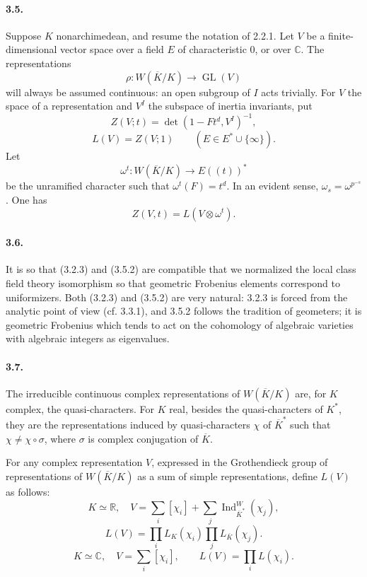 \documentclass[10pt]{article}
\newcommand{\C}{\mathbb C}
\newcommand{\GL}{\operatorname{GL}}
\newcommand{\Ind}{\operatorname{Ind}}
\providecommand{\R}{\mathbb R}
\begin{document}
\paragraph{3.5.} Suppose \(K\) nonarchimedean, and resume the notation of 2.2.1. Let \(V\) be a finite-dimensional vector space over a field \(E\) of characteristic \(0\), or over \(\C\). The representations
\[
\rho:W(\overline K/K)\longrightarrow\GL(V)
\]
will always be assumed continuous: an open subgroup of \(I\) acts trivially. For \(V\) the space of a representation and \(V^I\) the subspace of inertia invariants, put
\[
\tag{3.5.1}
Z(V;t)=\det(1-Ft^d,V^I)^{-1},
\]
\[
\tag{3.5.2}
L(V)=Z(V;1)\qquad(E\in E^*\cup\{\infty\}).
\]
Let
\[
\omega^t:W(\overline K/K)\longrightarrow E((t))^*
\]
be the unramified character such that \(\omega^t(F)=t^d\). In an evident sense, \(\omega_s=\omega^{p^{-s}}\). One has
\[
\tag{3.5.3}
Z(V,t)=L(V\otimes\omega^t).
\]

\paragraph{3.6.} It is so that (3.2.3) and (3.5.2) are compatible that we normalized the local class field theory isomorphism so that geometric Frobenius elements correspond to uniformizers. Both (3.2.3) and (3.5.2) are very natural: 3.2.3 is forced from the analytic point of view (cf. 3.3.1), and 3.5.2 follows the tradition of geometers; it is geometric Frobenius which tends to act on the cohomology of algebraic varieties with algebraic integers as eigenvalues.

\paragraph{3.7.} The irreducible continuous complex representations of \(W(\overline K/K)\) are, for \(K\) complex, the quasi-characters. For \(K\) real, besides the quasi-characters of \(K^*\), they are the representations induced by quasi-characters \(\chi\) of \(\overline K^*\) such that \(\chi\ne\chi\circ\sigma\), where \(\sigma\) is complex conjugation of \(\overline K\).

For any complex representation \(V\), expressed in the Grothendieck group of representations of \(W(\overline K/K)\) as a sum of simple representations, define \(L(V)\) as follows:
\[
\tag{3.7.1}
K\simeq\R,\quad
V=\sum_i[\chi_i]+\sum_j\Ind_{\overline K^*}^{W}(\chi_j),
\]
\[
L(V)=\prod_i L_K(\chi_i)\prod_j L_{\overline K}(\chi_j).
\]
\[
\tag{3.7.2}
K\simeq\C,\quad V=\sum_i[\chi_i],
\qquad
L(V)=\prod_iL(\chi_i).
\]
\end{document}
